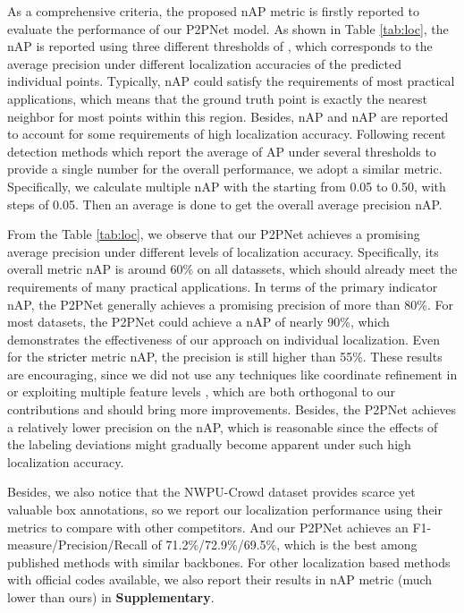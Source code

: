 \documentclass[10pt,twocolumn,letterpaper]{article}
\newcommand{\ywu}[1]{\textcolor{black}{#1}}
\begin{document}
As a comprehensive criteria, the proposed nAP metric is firstly reported to evaluate the performance of our P2PNet model. As shown in Table \ref{tab:loc}, the nAP is reported using three different thresholds of , which corresponds to the average precision under different localization accuracies of the predicted individual points. Typically, nAP could satisfy the requirements of most practical applications, which means that the ground truth point is exactly the nearest neighbor for most points within this region. Besides, nAP and nAP are reported to account for some requirements of high localization accuracy. Following recent detection methods which report the average of AP under several thresholds to provide a single number for the overall performance, we adopt a similar metric. Specifically, we calculate multiple nAP with the  starting from 0.05 to 0.50, with steps of 0.05. Then an average is done to get the overall average precision nAP.

From the Table \ref{tab:loc}, we observe that our P2PNet achieves a promising average precision under different levels of localization accuracy. Specifically, its overall metric nAP is around 60\% on all datassets, which should already meet the requirements of many practical applications. In terms of the primary indicator nAP, the P2PNet generally achieves a promising precision of more than 80\%. For most datasets, the P2PNet could achieve a nAP of nearly 90\%, which demonstrates the effectiveness of our approach on individual localization. Even for the \ywu{stricter} metric nAP, the precision is still higher than 55\%. These results are encouraging, since we did not use any techniques like coordinate refinement in \cite{cai2018cascade,zhang2018single} or exploiting multiple feature levels \cite{lin2017feature}, which are both orthogonal to our contributions and should bring more improvements. Besides, the P2PNet achieves a relatively lower precision on the nAP, which is reasonable since the effects of the labeling deviations might gradually become apparent under such high localization accuracy.

Besides, we also notice that the NWPU-Crowd dataset \cite{wang2020nwpu} provides scarce yet valuable box annotations, so we report our localization performance using their metrics to compare with other competitors. And our P2PNet achieves an F1-measure/Precision/Recall of 71.2\%/72.9\%/69.5\%, which is the best among published methods with similar backbones. For other localization based methods with official codes available, we also report their results in nAP metric (much lower than ours) in \textbf{Supplementary}.
\end{document}
